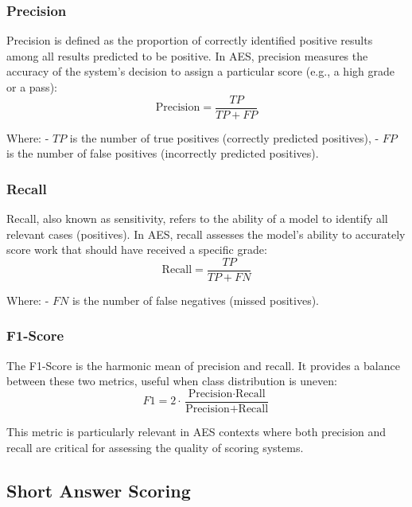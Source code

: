 \documentclass{article}
\begin{document}
	\subsubsection*{Precision}
	Precision is defined as the proportion of correctly identified positive results among all results predicted to be positive. In AES, precision measures the accuracy of the system's decision to assign a particular score (e.g., a high grade or a pass):
	$$ \text{Precision} = \frac{TP}{TP + FP} $$
	
	Where:
	- \( TP \) is the number of true positives (correctly predicted positives),
	- \( FP \) is the number of false positives (incorrectly predicted positives).
	
	\subsubsection*{Recall}
	Recall, also known as sensitivity, refers to the ability of a model to identify all relevant cases (positives). In AES, recall assesses the model's ability to accurately score work that should have received a specific grade:
	$$ \text{Recall} = \frac{TP}{TP + FN} $$
	
	Where:
	- \( FN \) is the number of false negatives (missed positives).
	
	\subsubsection*{F1-Score}
	The F1-Score is the harmonic mean of precision and recall. It provides a balance between these two metrics, useful when class distribution is uneven:
	$$ F1 = 2 \cdot \frac{\text{Precision} \cdot \text{Recall}}{\text{Precision} + \text{Recall}} $$
	
	This metric is particularly relevant in AES contexts where both precision and recall are critical for assessing the quality of scoring systems.
	
	\subsection{Short Answer Scoring}
	
\end{document}
